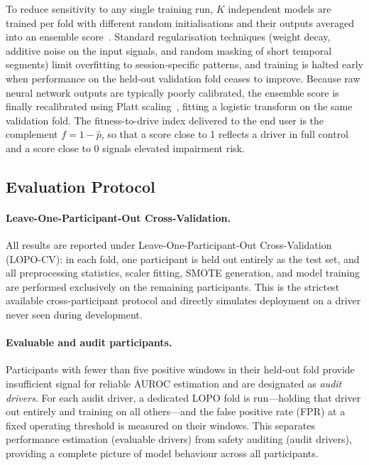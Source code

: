 To reduce sensitivity to any single training run, $K$ independent models are
trained per fold with different random initialisations and their outputs averaged
into an ensemble score~\cite{Lakshminarayanan2017}.
Standard regularisation techniques (weight decay, additive noise on the input
signals, and random masking of short temporal segments) limit overfitting to
session-specific patterns, and training is halted early when performance on the
held-out validation fold ceases to improve.
Because raw neural network outputs are typically poorly calibrated, the ensemble
score is finally recalibrated using Platt scaling~\cite{Guo2017}, fitting a
logistic transform on the same validation fold.
The fitness-to-drive index delivered to the end user is the complement
$f = 1 - \hat{p}$, so that a score close to 1 reflects a driver in full
control and a score close to 0 signals elevated impairment risk.

\subsection{Evaluation Protocol}

\paragraph{Leave-One-Participant-Out Cross-Validation.}
All results are reported under Leave-One-Participant-Out Cross-Validation
(LOPO-CV): in each fold, one participant is held out entirely as the test set,
and all preprocessing statistics, scaler fitting, SMOTE generation, and model
training are performed exclusively on the remaining participants.
This is the strictest available cross-participant protocol and directly
simulates deployment on a driver never seen during development.

\paragraph{Evaluable and audit participants.}
Participants with fewer than five positive windows in their held-out fold
provide insufficient signal for reliable AUROC estimation and are designated
as \emph{audit drivers}.
For each audit driver, a dedicated LOPO fold is run---holding that driver
out entirely and training on all others---and the false positive rate (FPR)
at a fixed operating threshold is measured on their windows.
This separates performance estimation (evaluable drivers) from safety
auditing (audit drivers), providing a complete picture of model behaviour
across all participants.

